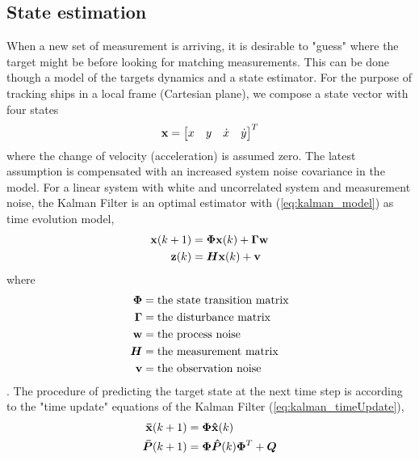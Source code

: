 \subsection{State estimation} %
When a new set of measurement is arriving, it is desirable to "guess" where the target might be before looking for matching measurements. This can be done though a model of the targets dynamics and a state estimator. For the purpose of tracking ships in a local frame (Cartesian plane), we compose a state vector with four states
\begin{equation}
\boldsymbol{\mathbf{x}} = \begin{bmatrix}
x & y & \dot{x} & \dot{y}
\end{bmatrix}^T
\label{eq:state_vector}
\end{equation}
where the change of velocity (acceleration) is assumed zero. The latest assumption is compensated with an increased system noise covariance in the model. For a linear system with white and uncorrelated system and measurement noise, the Kalman Filter is an optimal estimator with (\ref{eq:kalman_model}) as time evolution model,
\begin{equation}
\begin{split}
\boldsymbol{\mathbf{x}}(k+1) &= \bm{\Phi} \boldsymbol{\mathbf{x}}(k) + \bm{\Gamma} \boldsymbol{\mathbf{w}} \\
\boldsymbol{\mathbf{z}}(k) &= \bm{H} \boldsymbol{\mathbf{x}}(k) + \boldsymbol{\mathbf{v}}
\end{split}
\label{eq:kalman_model}
\end{equation}
where
\begin{equation}
\begin{split}
\bm{\Phi} 	&= \text{the state transition matrix} \\
\bm{\Gamma}	&= \text{the disturbance matrix} \\
\boldsymbol{\mathbf{w}}		&= \text{the process noise} \\
\bm{H} 		&= \text{the measurement matrix} \\
\boldsymbol{\mathbf{v}} 		&= \text{the observation noise} \\
\end{split}
\end{equation}.
The procedure of predicting the target state at the next time step is according to the "time update" equations of the Kalman Filter (\ref{eq:kalman_timeUpdate}),
\begin{equation}
\begin{split}
\boldsymbol{\mathbf{\bar{x}}}(k+1) 	&= \bm{\Phi} \boldsymbol{\mathbf{\hat{x}}}(k) \\
\bm{\bar{P}}(k+1)	&= \bm{\Phi} \bm{\hat{P}}(k)  \bm{\Phi}^T + \bm{Q} \\
\end{split}
\label{eq:kalman_timeUpdate}
\end{equation}
